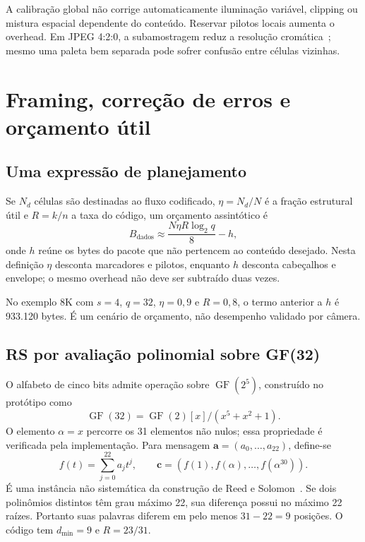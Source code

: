 \documentclass[11pt,a4paper]{article}
\newcommand{\GF}{\operatorname{GF}}
\begin{document}
A calibração global não corrige automaticamente iluminação variável, clipping ou mistura espacial dependente do conteúdo. Reservar pilotos locais aumenta o overhead. Em JPEG 4:2:0, a subamostragem reduz a resolução cromática~\cite{libjpegUsage}; mesmo uma paleta bem separada pode sofrer confusão entre células vizinhas.

\section{Framing, correção de erros e orçamento útil}
\subsection{Uma expressão de planejamento}
Se $N_d$ células são destinadas ao fluxo codificado, $\eta=N_d/N$ é a fração estrutural útil e $R=k/n$ a taxa do código, um orçamento assintótico é
\begin{equation}\label{eq:budget}
B_{\mathrm{dados}}\approx\frac{N\eta R\log_2q}{8}-h,
\end{equation}
onde $h$ reúne os bytes do pacote que não pertencem ao conteúdo desejado. Nesta definição $\eta$ desconta marcadores e pilotos, enquanto $h$ desconta cabeçalhos e envelope; o mesmo overhead não deve ser subtraído duas vezes.

No exemplo 8K com $s=4$, $q=32$, $\eta=0,9$ e $R=0,8$, o termo anterior a $h$ é 933.120 bytes. É um cenário de orçamento, não desempenho validado por câmera.

\subsection{RS por avaliação polinomial sobre GF(32)}
O alfabeto de cinco bits admite operação sobre $\GF(2^5)$, construído no protótipo como
\begin{equation}
\GF(32)=\GF(2)[x]/(x^5+x^2+1).
\end{equation}
O elemento $\alpha=x$ percorre os 31 elementos não nulos; essa propriedade é verificada pela implementação. Para mensagem $\mathbf a=(a_0,\ldots,a_{22})$, define-se
\begin{equation}
f(t)=\sum_{j=0}^{22}a_jt^j,\qquad
\mathbf c=(f(1),f(\alpha),\ldots,f(\alpha^{30})).
\end{equation}
É uma instância não sistemática da construção de Reed e Solomon~\cite{1960reedPolynomial}. Se dois polinômios distintos têm grau máximo 22, sua diferença possui no máximo 22 raízes. Portanto suas palavras diferem em pelo menos $31-22=9$ posições. O código tem $d_{\min}=9$ e $R=23/31$.
\end{document}
